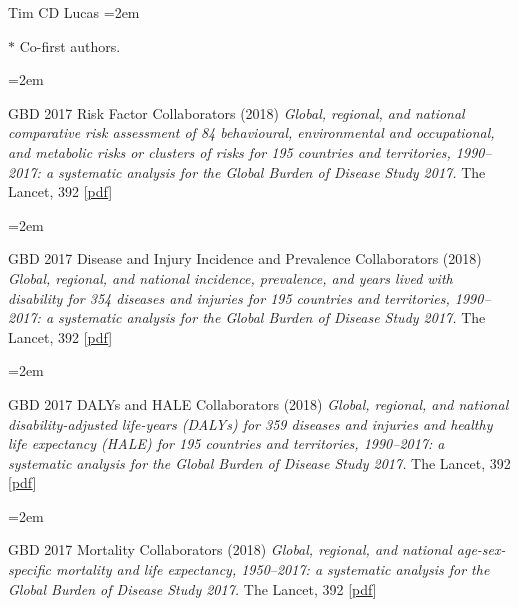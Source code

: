 \documentclass{scrartcl}
\newcommand{\MarginText}[1]{\marginpar{\raggedleft\itshape\small#1}} %
\newcommand{\Description}[1]{\hangindent=2em\hangafter=0\noindent\raggedright\footnotesize{#1}\par\normalsize\vspace{1em}} %
\begin{document}
\begin{cv}{Tim {\Large CD} Lucas}
\Description{\MarginText{} \scriptsize{ $\ast$ Co-first authors. } }



{\color{Maroon}}\vspace{1em}

\Description{\MarginText{2018}GBD 2017 Risk Factor Collaborators (2018) \emph{Global, regional, and national comparative risk assessment of 84 behavioural, environmental and occupational, and metabolic risks or clusters of risks for 195 countries and territories, 1990--2017: a systematic analysis for the Global Burden of Disease Study 2017.} The Lancet, 392 [\href{https://reader.elsevier.com/reader/sd/pii/S0140673618322256?token=B51BB41EDB592105E398079BFEE0CA91BB2DA80DC879A7B3CFD538DFBF8ADE6FA424858694B94E7860E6AE8461E553E7}{pdf}]}

\Description{GBD 2017 Disease and Injury Incidence and Prevalence Collaborators (2018) \emph{Global, regional, and national incidence, prevalence, and years lived with disability for 354 diseases and injuries for 195 countries and territories, 1990--2017: a systematic analysis for the Global Burden of Disease Study 2017.} The Lancet, 392 [\href{https://www.sciencedirect.com/science/article/pii/S0140673618322797/pdfft?md5=7f77aa9068dc470c4dec82747c586883&pid=1-s2.0-S0140673618322797-main.pdf}{pdf}]}


\Description{GBD 2017 DALYs and HALE Collaborators (2018) \emph{Global, regional, and national disability-adjusted life-years (DALYs) for 359 diseases and injuries and healthy life expectancy (HALE) for 195 countries and territories, 1990--2017: a systematic analysis for the Global Burden of Disease Study 2017.} The Lancet, 392 [\href{https://www.sciencedirect.com/science/article/pii/S0140673618318919/pdfft?md5=e63230d66805f99e38a7dc60873c7bf0&pid=1-s2.0-S0140673618318919-main.pdf}{pdf}]}

\Description{GBD 2017 Mortality Collaborators (2018) \emph{Global, regional, and national age-sex-specific mortality and life expectancy, 1950--2017: a systematic analysis for the Global Burden of Disease Study 2017.} The Lancet, 392 [\href{https://www.sciencedirect.com/science/article/pii/S0140673618323353/pdfft?md5=06fd82a2bba62e2be2849270cc28fe17&pid=1-s2.0-S0140673618323353-main.pdf}{pdf}]}


\end{cv}
\end{document}
